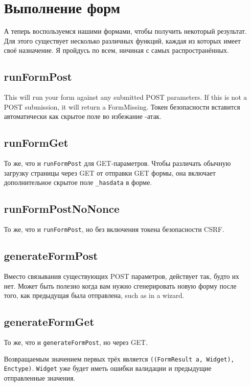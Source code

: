 \section{Выполнение форм}
А теперь воспользуемся нашими формами, чтобы получить некоторый результат. Для этого
существует несколько различных функций, каждая из которых имеет своё назначение. Я
пройдусь по всем, ничиная с самых распространённых.

\subsection{runFormPost}

This will run your form against any submitted POST parameters.
 If this is not a POST
submission, it will return a FormMissing. Токен безопасности вставится автоматически
как скрытое поле во избежание 
-атак.

\subsection{runFormGet}
То же, что и \lstinline'runFormPost' для GET-параметров. Чтобы различать обычную
загрузку страницы через GET от отправки GET формы, она включает дополнительное скрытое
поле \lstinline'_hasdata' в форме.

\subsection{runFormPostNoNonce}
То же, что и \lstinline'runFormPost', но без включения токена безопасности CSRF.

\subsection{generateFormPost}
Вместо связывания существующих POST параметров, действует так, будто их нет. Может
быть полезно когда вам нужно сгенерировать новую форму после того, как предыдущая была
отправлена, such as in a wizard.

\subsection{generateFormGet}
То же, что и \lstinline'generateFormPost', но через GET.

Возвращаемым значением первых трёх является \lstinline'((FormResult a, Widget), Enctype)'.
\lstinline'Widget' уже будет иметь ошибки валидации и предыдущие отправленные значения.

